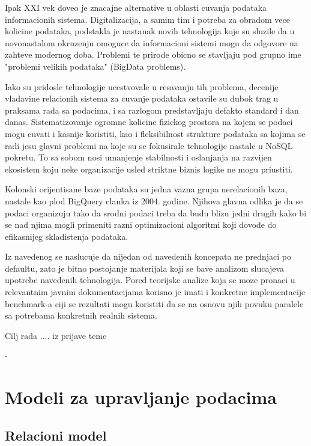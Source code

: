 \documentclass[12pt,oneside]{memoir}
\begin{document}
Ipak XXI vek doveo je znacajne alternative u oblasti cuvanja podataka informacionih sistema. Digitalizacija, a samim tim i potreba za obradom vece kolicine podataka, podstakla je nastanak novih tehnologija koje su sluzile da u novonastalom okruzenju omoguce da informacioni sistemi mogu da odgovore na zahteve modernog doba. Problemi te prirode obicno se stavljaju pod grupno ime "problemi velikih podataka" (BigData problems).

Iako su pridosle tehnologije ucestvovale u resavanju tih problema, decenije vladavine  relacionih sistema za cuvanje podataka ostavile su dubok trag u praksama rada sa podacima,  i sa razlogom predstavljaju defakto standard i dan danas. 
Sistematizovanje ogromne kolicine fizickog prostora na kojem se podaci mogu cuvati i kasnije koristiti, kao i fleksibilnost strukture podataka sa kojima se radi jesu glavni problemi na koje su se fokusirale tehnologije nastale u NoSQL pokretu. To sa sobom nosi umanjenje stabilnosti i oslanjanja na razvijen ekosistem koju neke organizacije  usled striktne biznis logike ne mogu priustiti. 

Kolonski orijentisane baze podataka su jedna vazna grupa nerelacionih baza, nastale kao plod BigQuery clanka iz 2004. godine. Njihova glavna odlika je da se podaci organizuju tako da srodni podaci treba da budu blizu jedni drugih kako bi se nad njima mogli primeniti razni optimizacioni algoritmi koji dovode do efikasnijeg skladistenja podataka.

Iz navedenog se naslucuje da nijedan od navedenih koncepata ne prednjaci po defaultu, zato je bitno postojanje materijala koji se bave analizom slucajeva upotrebe navedenih tehnologija. Pored teorijske analize koja se moze pronaci u relevantnim javnim dokumentacijama korisno je imati i konkretne implementacije benchmark-a ciji se rezultati mogu koristiti da se na osnovu  njih povuku paralele sa potrebama konkretnih realnih sistema.

Cilj rada .... iz prijave teme

\cite{}-


\chapter{Modeli za upravljanje podacima}
\label{chp:razrada}
\section{Relacioni model}
\end{document}
